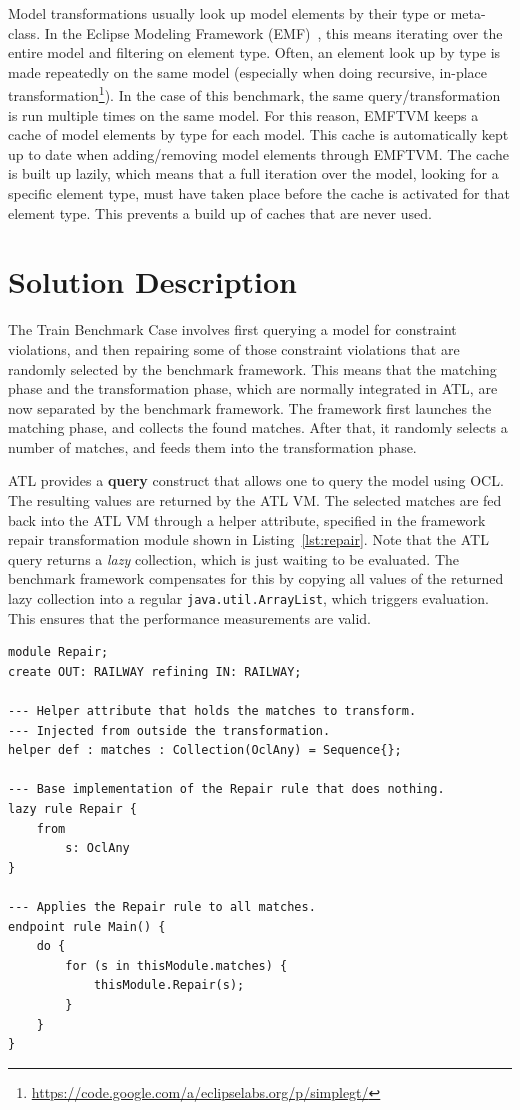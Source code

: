 \documentclass[submission,copyright,creativecommons]{eptcs}
\begin{document}
Model transformations usually look up model elements by their type or meta-class. In the Eclipse Modeling Framework (EMF)~\cite{book/Budinsky03}, this means iterating over the entire model and filtering on element type. Often, an element look up by type is made repeatedly on the same model (especially when doing recursive, in-place transformation\footnote{\url{https://code.google.com/a/eclipselabs.org/p/simplegt/}}). In the case of this benchmark, the same query/transformation is run multiple times on the same model. For this reason, EMFTVM keeps a cache of model elements by type for each model. This cache is automatically kept up to date when adding/removing model elements through EMFTVM. The cache is built up lazily, which means that a full iteration over the model, looking for a specific element type, must have taken place before the cache is activated for that element type. This prevents a build up of caches that are never used.

\section{Solution Description}
\label{sec:solution}

The Train Benchmark Case involves first querying a model for constraint violations, and then repairing some of those constraint violations that are randomly selected by the benchmark framework. This means that the matching phase and the transformation phase, which are normally integrated in ATL, are now separated by the benchmark framework. The framework first launches the matching phase, and collects the found matches. After that, it randomly selects a number of matches, and feeds them into the transformation phase.

ATL provides a \textbf{query} construct that allows one to query the model using OCL. The resulting values are returned by the ATL VM. The selected matches are fed back into the ATL VM through a helper attribute, specified in the framework repair transformation module shown in Listing~\ref{lst:repair}. Note that the ATL query returns a \emph{lazy} collection, which is just waiting to be evaluated. The benchmark framework compensates for this by copying all values of the returned lazy collection into a regular \texttt{java.util.ArrayList}, which triggers evaluation. This ensures that the performance measurements are valid.

\lstset{language=atl}
\begin{lstlisting}[float=htb, caption={Framework repair transformation module in ATL}, label=lst:repair, captionpos=b, frame=tb, belowskip=-10pt]
module Repair;
create OUT: RAILWAY refining IN: RAILWAY;

--- Helper attribute that holds the matches to transform.
--- Injected from outside the transformation.
helper def : matches : Collection(OclAny) = Sequence{};

--- Base implementation of the Repair rule that does nothing.
lazy rule Repair {
	from
		s: OclAny
}

--- Applies the Repair rule to all matches.
endpoint rule Main() {
	do {
		for (s in thisModule.matches) {
			thisModule.Repair(s);
		}
	}
}
\end{lstlisting}
\end{document}
